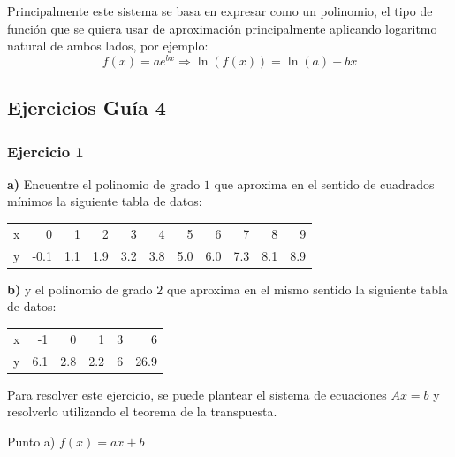 \documentclass{article}
\begin{document}
Principalmente este sistema se basa en expresar como un polinomio, el tipo de función que se quiera usar de aproximación principalmente aplicando logaritmo natural de ambos lados, por ejemplo:
\begin{equation}
    f(x) = ae^{bx} \Rightarrow \ln(f(x)) = \ln(a) + bx
\end{equation}
\subsection{Ejercicios Guía 4}
\subsubsection{Ejercicio 1}
\noindent \textbf{a)} Encuentre el polinomio de grado $1$ que aproxima en el sentido de cuadrados m\'inimos la siguiente tabla de datos:
\begin{center}
\begin{tabular}{||r||r|r|r|r|r|r|r|r|r|r||}
\hline
x & 0 & 1 & 2 & 3 & 4 & 5 & 6 & 7 & 8 & 9 \\
y & -0.1 & 1.1 & 1.9 & 3.2 & 3.8 & 5.0 & 6.0 & 7.3 & 8.1 & 8.9 \\
\hline
\end{tabular}
\end{center}
\textbf{b)} y el polinomio de grado $2$ que aproxima en el mismo sentido la siguiente tabla de datos:
\begin{center}
\begin{tabular}{||r||r|r|r|r|r||}
\hline
x & -1 & 0 & 1 & 3 & 6 \\
y & 6.1 & 2.8 & 2.2 & 6 & 26.9 \\
\hline
\end{tabular}
\end{center}
Para resolver este ejercicio, se puede plantear el sistema de ecuaciones $Ax = b$ y resolverlo utilizando el teorema de la transpuesta.
\begin{center}
    Punto a) $f(x) = ax + b$ \\
\end{center}
\end{document}
